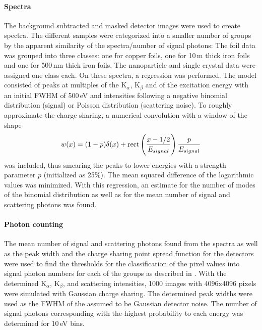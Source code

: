 \paragraph{Spectra}
The background subtracted and masked detector images were used to create spectra. The different samples were categorized into a smaller number of groups by the apparent similarity of the spectra/number of signal photons: The foil  data was grouped into three classes: one for copper foils, one for 10\,\textmu m thick iron foils and one for 500\,nm thick iron foils. The nanoparticle and single crystal data were assigned one class each.
On these spectra, a regression was performed.  The model consisted of peaks at multiples of the K$_\alpha$, K$_\beta$ and of the excitation energy with an initial FWHM of 500\,eV and intensities following a negative binomial distribution (signal) or Poisson distribution (scattering noise). To roughly approximate the charge sharing, a numerical convolution with a  window of the shape
\begin{equation}
	w (x)= (1-p)\delta(x)+\operatorname{rect}\left(\frac{x-1/2}{E_{signal}}\right)\frac{p}{E_{signal}}
\end{equation}
was included, thus smearing the peaks to lower energies with a strength parameter $p$ (initialized as 25\%). The mean squared difference of the logarithmic values was minimized. With this regression, an estimate for the number of modes of the binomial distribution as well as for the mean number of signal and scattering photons was found.


\paragraph{Photon counting}
The mean number of signal and scattering photons found from the spectra as well as the peak width and the charge sharing point spread function for the detectors were used to find the thresholds for the classification of the pixel values into signal photon numbers for each of the groups as described in . 
With the determined K$_\alpha$, K$_\beta$, and scattering intensities, 1000 images with 4096x4096 pixels were simulated with Gaussian charge sharing. The determined peak widths were used as the FWHM of the assumed to be Gaussian detector noise.  The number of signal photons corresponding with the highest probability to each energy was determined for 10\,eV bins. 

